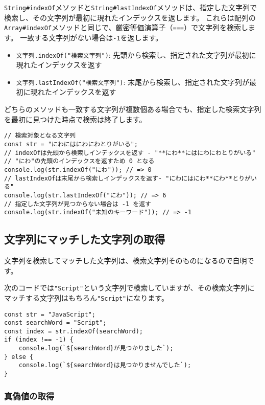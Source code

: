 \texttt{String\#indexOf}メソッドと\texttt{String\#lastIndexOf}メソッドは、指定した文字列で検索し、その文字列が最初に現れたインデックスを返します。
これらは配列の\texttt{Array\#indexOf}メソッドと同じで、厳密等価演算子（\texttt{===}）で文字列を検索します。
一致する文字列がない場合は\texttt{-1}を返します。

\begin{itemize}
\item
  \texttt{文字列.indexOf("検索文字列")}:
  先頭から検索し、指定された文字列が最初に現れたインデックスを返す
\item
  \texttt{文字列.lastIndexOf("検索文字列")}:
  末尾から検索し、指定された文字列が最初に現れたインデックスを返す
\end{itemize}

どちらのメソッドも一致する文字列が複数個ある場合でも、指定した検索文字列を最初に見つけた時点で検索は終了します。

\begin{lstlisting}
// 検索対象となる文字列
const str = "にわにはにわにわとりがいる";
// indexOfは先頭から検索しインデックスを返す - "**にわ**にはにわにわとりがいる"
// "にわ"の先頭のインデックスを返すため 0 となる
console.log(str.indexOf("にわ")); // => 0
// lastIndexOfは末尾から検索しインデックスを返す- "にわにはにわ**にわ**とりがいる"
console.log(str.lastIndexOf("にわ")); // => 6
// 指定した文字列が見つからない場合は -1 を返す
console.log(str.indexOf("未知のキーワード")); // => -1
\end{lstlisting}

\hypertarget{match-by-string}{%
\subsection{文字列にマッチした文字列の取得}\label{match-by-string}}

文字列を検索してマッチした文字列は、検索文字列そのものになるので自明です。

次のコードでは\texttt{"Script"}という文字列で検索していますが、その検索文字列にマッチする文字列はもちろん\texttt{"Script"}になります。

\begin{lstlisting}
const str = "JavaScript";
const searchWord = "Script";
const index = str.indexOf(searchWord);
if (index !== -1) {
    console.log(`${searchWord}が見つかりました`);
} else {
    console.log(`${searchWord}は見つかりませんでした`);
}
\end{lstlisting}

\hypertarget{test-by-string}{%
\subsubsection{真偽値の取得}\label{test-by-string}}

